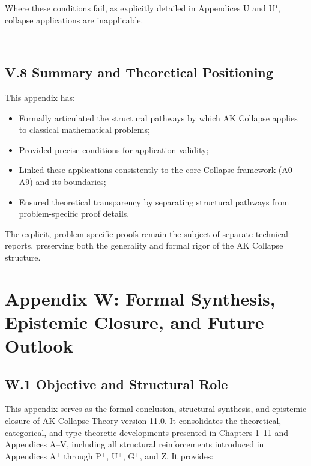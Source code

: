 \documentclass[11pt]{article}
\begin{document}
Where these conditions fail, as explicitly detailed in Appendices U and U⁺, collapse applications are inapplicable.

---

\subsection*{V.8 Summary and Theoretical Positioning}

This appendix has:

\begin{itemize}
    \item Formally articulated the structural pathways by which AK Collapse applies to classical mathematical problems;
    \item Provided precise conditions for application validity;
    \item Linked these applications consistently to the core Collapse framework (A0–A9) and its boundaries;
    \item Ensured theoretical transparency by separating structural pathways from problem-specific proof details.
\end{itemize}

The explicit, problem-specific proofs remain the subject of separate technical reports, preserving both the generality and formal rigor of the AK Collapse structure.




\section*{Appendix W: Formal Synthesis, Epistemic Closure, and Future Outlook}

\subsection*{W.1 Objective and Structural Role}

This appendix serves as the formal conclusion, structural synthesis, and epistemic closure of AK Collapse Theory version 11.0.  
It consolidates the theoretical, categorical, and type-theoretic developments presented in Chapters 1–11 and Appendices A–V, including all structural reinforcements introduced in Appendices A$^{+}$ through P$^{+}$, U$^{+}$, G$^{+}$, and Z.  
It provides:
\end{document}

